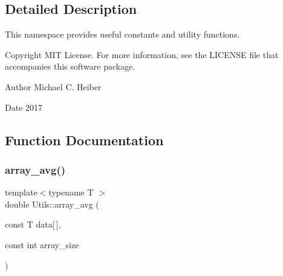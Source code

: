 

\subsection{Detailed Description}
This namespace provides useful constants and utility functions. 

\begin{DoxyCopyright}{Copyright}
M\+IT License. For more information, see the L\+I\+C\+E\+N\+SE file that accompanies this software package. 
\end{DoxyCopyright}
\begin{DoxyAuthor}{Author}
Michael C. Heiber 
\end{DoxyAuthor}
\begin{DoxyDate}{Date}
2017 
\end{DoxyDate}


\subsection{Function Documentation}
\mbox{\label{namespace_utils_aa76a204af4dd4c3eb151691825de2eb2}} 
\subsubsection{\texorpdfstring{array\+\_\+avg()}{array\_avg()}}
{\footnotesize\ttfamily template$<$typename T $>$ \\
double Utils\+::array\+\_\+avg (\begin{DoxyParamCaption}\item[{const T}]{data\mbox{[}$\,$\mbox{]},  }\item[{const int}]{array\+\_\+size }\end{DoxyParamCaption})}



